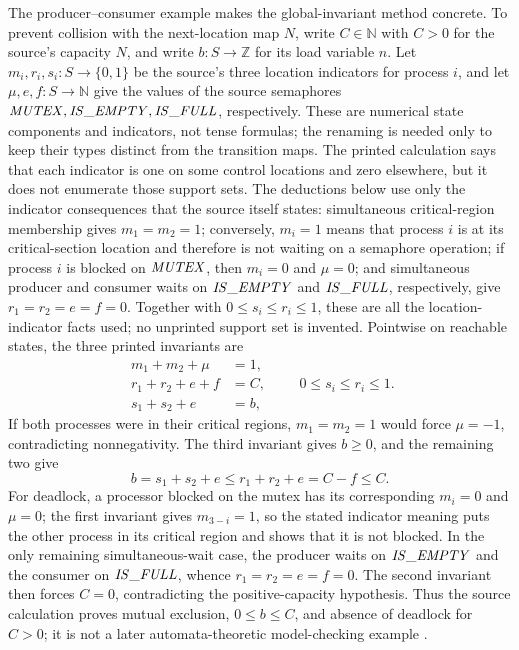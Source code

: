The producer--consumer example makes the global-invariant method concrete.
To prevent collision with the next-location map \(N\), write
\(C\in\mathbb N\) with \(C>0\) for the source's capacity \(N\), and write
\(b:S\to\mathbb Z\) for its load variable \(n\).  Let
\(m_i,r_i,s_i:S\to\{0,1\}\) be the source's three location indicators for
process \(i\), and let
\(\mu,e,f:S\to\mathbb N\) give the values of the source semaphores
\({\it MUTEX},{\it IS\_EMPTY},{\it IS\_FULL}\), respectively.  These are
numerical state components and indicators, not tense formulas; the renaming is
needed only to keep their types distinct from the transition maps.  The printed
calculation says that each indicator is one on some control locations and zero
elsewhere, but it does not enumerate those support sets.  The deductions below
use only the indicator consequences that the source itself states:
simultaneous critical-region membership gives \(m_1=m_2=1\); conversely,
\(m_i=1\) means that process \(i\) is at its critical-section location and
therefore is not waiting on a semaphore operation; if process \(i\) is blocked
on \({\it MUTEX}\), then \(m_i=0\) and \(\mu=0\); and simultaneous producer
and consumer waits on \({\it IS\_EMPTY}\) and
\({\it IS\_FULL}\), respectively, give \(r_1=r_2=e=f=0\).  Together with
\(0\le s_i\le r_i\le1\), these are all the location-indicator facts used; no
unprinted support set is invented.  Pointwise on reachable states, the three
printed invariants are
\[
\begin{aligned}
 m_1+m_2+\mu&=1,\\
 r_1+r_2+e+f&=C,\\
 s_1+s_2+e&=b,
\end{aligned}
\qquad 0\le s_i\le r_i\le1.
\]
If both processes were in their critical regions, \(m_1=m_2=1\) would force
\(\mu=-1\), contradicting nonnegativity.  The third invariant gives
\(b\ge0\), and the remaining two give
\[
 b=s_1+s_2+e
 \le r_1+r_2+e=C-f\le C.
\]
For deadlock, a processor blocked on the mutex has its corresponding
\(m_i=0\) and \(\mu=0\); the first invariant gives \(m_{3-i}=1\), so the
stated indicator meaning puts the other process in its critical region and
shows that it is not blocked.  In the only remaining
simultaneous-wait case, the producer waits on \({\it IS\_EMPTY}\) and the
consumer on \({\it IS\_FULL}\), whence
\(r_1=r_2=e=f=0\).  The second invariant then forces \(C=0\), contradicting
the positive-capacity hypothesis.  Thus the source calculation proves mutual
exclusion, \(0\le b\le C\), and absence of deadlock for \(C>0\); it is not a
later automata-theoretic model-checking example
\cite[pp.~51--52]{Pnueli1977}.

